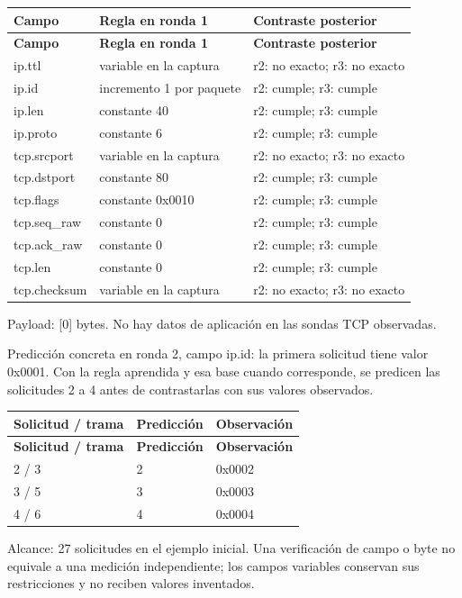 \begingroup
\fontsize{9}{11}\selectfont
\addtocounter{table}{-1}
\begin{longtable}{p{3.1cm}p{5.8cm}p{5.1cm}}
\toprule
\textbf{Campo} & \textbf{Regla en ronda 1} & \textbf{Contraste posterior} \\ \midrule
\endfirsthead
\toprule
\textbf{Campo} & \textbf{Regla en ronda 1} & \textbf{Contraste posterior} \\ \midrule
\endhead
ip.ttl & variable en la captura & r2: no exacto; r3: no exacto \\
ip.id & incremento 1 por paquete & r2: cumple; r3: cumple \\
ip.len & constante 40 & r2: cumple; r3: cumple \\
ip.proto & constante 6 & r2: cumple; r3: cumple \\
tcp.srcport & variable en la captura & r2: no exacto; r3: no exacto \\
tcp.dstport & constante 80 & r2: cumple; r3: cumple \\
tcp.flags & constante 0x0010 & r2: cumple; r3: cumple \\
tcp.seq\_\allowbreak{}raw & constante 0 & r2: cumple; r3: cumple \\
tcp.ack\_\allowbreak{}raw & constante 0 & r2: cumple; r3: cumple \\
tcp.len & constante 0 & r2: cumple; r3: cumple \\
tcp.checksum & variable en la captura & r2: no exacto; r3: no exacto \\
\bottomrule
\end{longtable}
\endgroup
Payload: [0] bytes. No hay datos de aplicación en las sondas TCP observadas.

Predicción concreta en ronda 2, campo ip.id: la primera solicitud tiene valor 0x0001. Con la regla aprendida y esa base cuando corresponde, se predicen las solicitudes 2 a 4 antes de contrastarlas con sus valores observados.

\begingroup
\fontsize{9}{11}\selectfont
\addtocounter{table}{-1}
\begin{longtable}{p{3.2cm}p{5.1cm}p{5.1cm}}
\toprule
\textbf{Solicitud / trama} & \textbf{Predicción} & \textbf{Observación} \\ \midrule
\endfirsthead
\toprule
\textbf{Solicitud / trama} & \textbf{Predicción} & \textbf{Observación} \\ \midrule
\endhead
2 / 3 & 2 & 0x0002 \\
3 / 5 & 3 & 0x0003 \\
4 / 6 & 4 & 0x0004 \\
\bottomrule
\end{longtable}
\endgroup
Alcance: 27 solicitudes en el ejemplo inicial. Una verificación de campo o byte no equivale a una medición independiente; los campos variables conservan sus restricciones y no reciben valores inventados.

